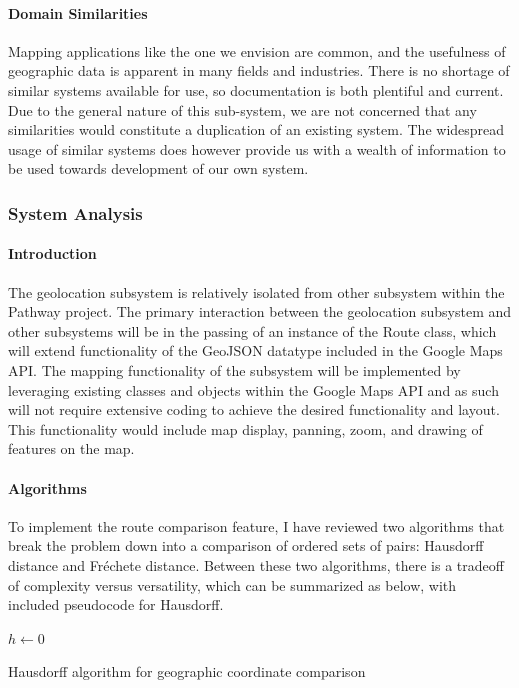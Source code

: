 ﻿\documentclass{article}
\begin{document}
\paragraph{Domain Similarities}
Mapping applications like the one we envision are common, and the usefulness of geographic data is apparent in many fields and industries. There is no shortage of similar systems available for use, so documentation is both plentiful and current. Due to the general nature of this sub-system, we are not concerned that any similarities would constitute a duplication of an existing system. The widespread usage of similar systems does however provide us with a wealth of information to be used towards development of our own system.

\subsubsection{System Analysis}
\paragraph{Introduction}
The geolocation subsystem is relatively isolated from other subsystem within the Pathway project. The primary interaction between the geolocation 
subsystem and other subsystems will be in the passing of an instance of the Route class, which will extend functionality of the GeoJSON datatype 
included in the Google Maps API. The mapping functionality of the subsystem will be implemented by leveraging existing classes and objects within 
the Google Maps API and as such will not require extensive coding to achieve the desired functionality and layout. 
This functionality would include map display, panning, zoom, and drawing of features on the map.

\paragraph{Algorithms}
To implement the route comparison feature, I have reviewed two algorithms that break the problem down into a comparison of ordered sets of pairs: 
Hausdorff distance and Fréchete distance. Between these two algorithms, there is a tradeoff of complexity versus versatility, 
which can be summarized as below, with included pseudocode for Hausdorff.

\begin{algorithm}[h]
\SetAlgoLined
$h \gets 0$\\
\caption{Hausdorff algorithm for geographic coordinate comparison}
\end{algorithm}
\end{document}
